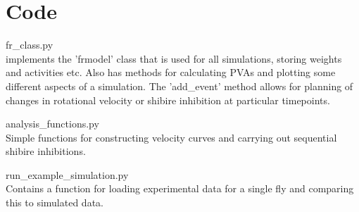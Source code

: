 \documentclass{article}
\begin{document}
\section*{Code}

fr\_class.py\\
implements the 'frmodel' class that is used for all simulations, storing weights and activities etc. Also has methods for calculating PVAs and plotting some different aspects of a simulation. The 'add\_event' method allows for planning of changes in rotational velocity or shibire inhibition at particular timepoints.

analysis\_functions.py\\
Simple functions for constructing velocity curves and carrying out sequential shibire inhibitions.

run\_example\_simulation.py\\
Contains a function for loading experimental data for a single fly and comparing this to simulated data.



%
\end{document}

